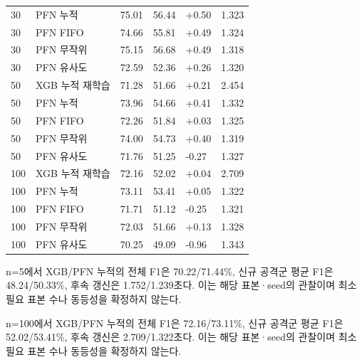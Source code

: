 \begin{longtable}
{}30 & PFN 누적 & 75.01 & 56.44 & +\allowbreak{}0.50 & 1.323 \\
{}30 & PFN FIFO & 74.66 & 55.81 & +\allowbreak{}0.49 & 1.324 \\
{}30 & PFN 무작위 & 75.15 & 56.68 & +\allowbreak{}0.49 & 1.318 \\
{}30 & PFN 유사도 & 72.59 & 52.36 & +\allowbreak{}0.26 & 1.320 \\
{}50 & XGB 누적 재학습 & 71.28 & 51.66 & +\allowbreak{}0.21 & 2.454 \\
{}50 & PFN 누적 & 73.96 & 54.66 & +\allowbreak{}0.41 & 1.332 \\
{}50 & PFN FIFO & 72.26 & 51.84 & +\allowbreak{}0.03 & 1.325 \\
{}50 & PFN 무작위 & 74.00 & 54.73 & +\allowbreak{}0.40 & 1.319 \\
{}50 & PFN 유사도 & 71.76 & 51.25 & -0.27 & 1.327 \\
{}100 & XGB 누적 재학습 & 72.16 & 52.02 & +\allowbreak{}0.04 & 2.709 \\
{}100 & PFN 누적 & 73.11 & 53.41 & +\allowbreak{}0.05 & 1.322 \\
{}100 & PFN FIFO & 71.71 & 51.12 & -0.25 & 1.321 \\
{}100 & PFN 무작위 & 72.03 & 51.66 & +\allowbreak{}0.13 & 1.328 \\
{}100 & PFN 유사도 & 70.25 & 49.09 & -0.96 & 1.343 \\
\bottomrule
\end{longtable}
\endgroup
n=\allowbreak{}5에서 XGB/\allowbreak{}PFN 누적의 전체 F1은 70.22/\allowbreak{}71.44\%, 신규 공격군 평균 F1은 48.24/\allowbreak{}50.33\%, 후속 갱신은 1.752/\allowbreak{}1.239초다. 이는 해당 표본·seed의 관찰이며 최소 필요 표본 수나 동등성을 확정하지 않는다.

n=\allowbreak{}100에서 XGB/\allowbreak{}PFN 누적의 전체 F1은 72.16/\allowbreak{}73.11\%, 신규 공격군 평균 F1은 52.02/\allowbreak{}53.41\%, 후속 갱신은 2.709/\allowbreak{}1.322초다. 이는 해당 표본·seed의 관찰이며 최소 필요 표본 수나 동등성을 확정하지 않는다.

